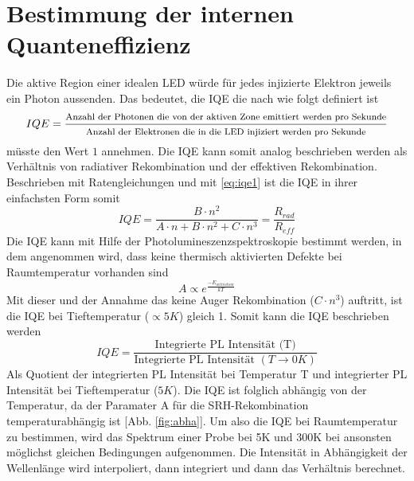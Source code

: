 
\section{Bestimmung der internen Quanteneffizienz}


Die aktive Region einer idealen LED würde für jedes injizierte Elektron jeweils ein Photon aussenden. 
Das bedeutet, die IQE die nach \cite{schub} wie folgt definiert ist
\begin{equation}
    IQE = \frac{ \footnotesize \text{Anzahl der Photonen die von der aktiven Zone emittiert werden pro Sekunde}}{ \footnotesize \text{Anzahl der Elektronen die in die LED injiziert werden pro Sekunde}}
\end{equation}
müsste den Wert $1$ annehmen. Die IQE kann somit analog beschrieben werden als Verhältnis von radiativer Rekombination und der effektiven Rekombination. Beschrieben mit Ratengleichungen und mit \ref{eq:iqe1} ist die IQE in ihrer einfachsten Form somit
\begin{equation}
    IQE = \frac{B \cdot n^2}{A \cdot n + B \cdot n^2 + C \cdot n^3} = \frac{R_{rad}}{R_{eff}}
\end{equation}
Die IQE kann mit Hilfe der Photolumineszenzspektroskopie bestimmt werden, in dem angenommen wird, dass keine thermisch aktivierten Defekte bei Raumtemperatur vorhanden sind
\begin{equation}
    A \propto e^{\frac{-E_{activation}}{kT}}
\end{equation}
Mit dieser und der Annahme das keine Auger Rekombination ($ C \cdot n^3 $) auftritt, ist die IQE bei Tieftemperatur ($ \propto 5K$) gleich 1. Somit kann die IQE beschrieben werden
\begin{equation}
    IQE = \frac{\text{Integrierte PL Intensität (T)}}{ \text{Integrierte PL Intensität } (T \rightarrow 0 K) }
\end{equation}
Als Quotient der integrierten PL Intensität bei Temperatur T und integrierter PL Intensität bei Tieftemperatur ($5K$). Die IQE ist folglich abhängig von der Temperatur, da der Paramater A für die SRH-Rekombination temperaturabhängig ist [Abb. \ref{fig:abha}]. 
Um also die IQE bei Raumtemperatur zu bestimmen, wird das Spektrum einer Probe bei 5K und 300K bei ansonsten möglichst gleichen Bedingungen aufgenommen. Die Intensität in Abhängigkeit der Wellenlänge wird interpoliert, dann integriert und dann das Verhältnis berechnet.
%
